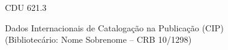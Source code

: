 \begin{fichacatalografica}
\begin{center}
{\begin{minipage}[t]{11cm}
            	\hspace{8.75cm} CDU 621.3 %
            \end{minipage}
        }
        \hspace{0.5cm}
        Dados Internacionais de Catalogação na Publicação (CIP) \\  	
        (Bibliotecário: Nome Sobrenome – CRB 10/1298)
    \end{center}
\end{fichacatalografica}







%
% 
%

